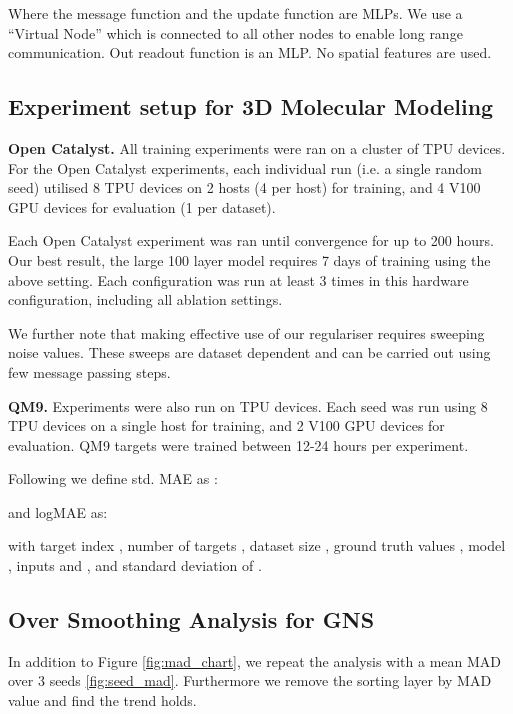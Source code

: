 \documentclass{article} \usepackage{iclr2022_conference,times}
\begin{document}
Where the message function  and the update function  are MLPs. We use a ``Virtual Node'' which is connected to all other nodes to enable long range communication. Out readout function is an MLP. No spatial features are used.

\subsection{Experiment setup for 3D Molecular Modeling}
\textbf{Open Catalyst.}
All training experiments were ran on a cluster of TPU devices. For the Open Catalyst experiments, each individual run (i.e. a single random seed) utilised 8 TPU devices on 2 hosts (4 per host) for training, and 4 V100 GPU devices for evaluation (1 per dataset). 

Each Open Catalyst experiment was ran until convergence for up to 200 hours. Our best result, the large 100 layer model requires 7 days of training using the above setting. 
Each configuration was run at least 3 times in this hardware configuration, including all ablation settings. 

We further note that making effective use of our regulariser requires sweeping noise values. These sweeps are dataset dependent and can be carried out using few message passing steps.

\textbf{QM9.}
Experiments were also run on TPU devices. Each seed was run using 8 TPU devices on a single host for training, and 2 V100 GPU devices for evaluation. QM9 targets were trained between 12-24 hours per experiment.

Following \cite{Klicpera2020DirectionalMP} we define std. MAE as :



and logMAE as:



with target index , number of targets , dataset size , ground truth values , model , inputs  and , and standard deviation  of .

\subsection{Over Smoothing Analysis for GNS}

In addition to Figure \ref{fig:mad_chart}, we repeat the analysis with a mean MAD over 3 seeds \ref{fig:seed_mad}. Furthermore we remove the sorting layer by MAD value and find the trend holds.
\end{document}

